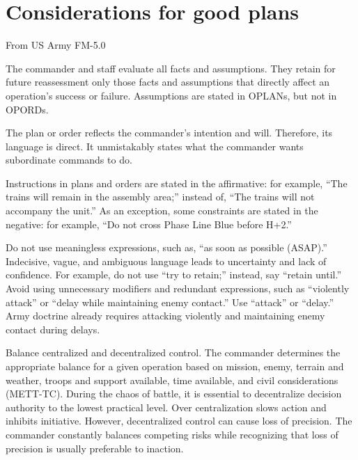 \documentclass[11pt,fleqn]{memoir} %
\begin{document}
    \section{Considerations for good plans}
      From US Army FM-5.0
      \begin{description}[style=nextline]
        \item[Contain critical facts and assumptions]
          The commander and staff evaluate all facts and assumptions. They retain for future reassessment only those facts and assumptions that directly affect an operation’s success or failure. Assumptions are stated in OPLANs, but not in OPORDs.
        \item[Authoritative expression]
          The plan or order reflects the commander’s intention and will. Therefore, its language is direct. It unmistakably states what the commander wants subordinate commands to do.
        \item[Positive expression]
          Instructions in plans and orders are stated in the affirmative: for example, ``The trains will remain in the assembly area;'' instead of, ``The trains will not accompany the unit.'' As an exception, some constraints are stated in the negative: for example, ``Do not cross Phase Line Blue before H+2.''
        \item[Avoid qualified directives]
          Do not use meaningless expressions, such as, ``as soon as possible (ASAP).'' Indecisive, vague, and ambiguous language leads to uncertainty and lack of confidence. For example, do not use ``try to retain;'' instead, say ``retain until.'' Avoid using unnecessary modifiers and redundant expressions, such as ``violently attack'' or ``delay while maintaining enemy contact.'' Use ``attack'' or ``delay.'' Army doctrine already requires attacking violently and maintaining enemy contact during delays.
        \item[Balance]
          Balance centralized and decentralized control. The commander determines the appropriate balance for a given operation based on mission, enemy, terrain and weather, troops and support available, time available, and civil considerations (METT-TC). During the chaos of battle, it is essential to decentralize decision authority to the lowest practical level. Over centralization slows action and inhibits initiative. However, decentralized control can cause loss of precision. The commander constantly balances competing risks while recognizing that loss of precision is usually preferable to inaction.
        \item[Simplicity]

\end{description}
\end{document}
